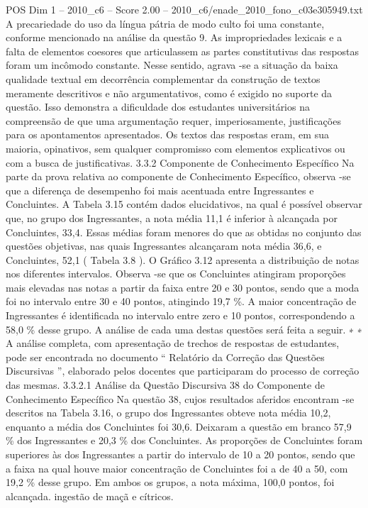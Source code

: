 \begin{textsample}{POS Dim 1 – 2010\_c6 – Score 2.00 – 2010\_c6/enade\_2010\_fono\_c03e305949.txt}
A precariedade do uso da língua pátria de modo culto foi uma constante, conforme mencionado na análise da questão 9.
As impropriedades lexicais e a falta de elementos coesores que articulassem as partes constitutivas das respostas foram um incômodo constante.
Nesse sentido, agrava -se a situação da baixa qualidade textual em decorrência complementar da construção de textos meramente descritivos e não argumentativos, como é exigido no suporte da questão.
Isso demonstra a dificuldade dos estudantes universitários na compreensão de que uma argumentação requer, imperiosamente, justificações para os apontamentos apresentados.
Os textos das respostas eram, em sua maioria, opinativos, sem qualquer compromisso com elementos explicativos ou com a busca de justificativas. 3.3.2 Componente de Conhecimento Específico Na parte da prova relativa ao componente de Conhecimento Específico, observa -se que a diferença de desempenho foi mais acentuada entre Ingressantes e Concluintes.
A Tabela 3.15 contém dados elucidativos, na qual é possível observar que, no grupo dos Ingressantes, a nota média 11,1 é inferior à alcançada por Concluintes, 33,4.
Essas médias foram menores do que as obtidas no conjunto das questões objetivas, nas quais Ingressantes alcançaram nota média 36,6, e Concluintes, 52,1 ( Tabela 3.8 ).
O Gráfico 3.12 apresenta a distribuição de notas nos diferentes intervalos.
Observa -se que os Concluintes atingiram proporções mais elevadas nas notas a partir da faixa entre 20 e 30 pontos, sendo que a moda foi no intervalo entre 30 e 40 pontos, atingindo 19,7 \%.
A maior concentração de Ingressantes é identificada no intervalo entre zero e 10 pontos, correspondendo a 58,0 \% desse grupo.
A análise de cada uma destas questões será feita a seguir. ∗ ∗ A análise completa, com apresentação de trechos de respostas de estudantes, pode ser encontrada no documento “ Relatório da Correção das Questões Discursivas ”, elaborado pelos docentes que participaram do processo de correção das mesmas. 3.3.2.1 Análise da Questão Discursiva 38 do Componente de Conhecimento Específico Na questão 38, cujos resultados aferidos encontram -se descritos na Tabela 3.16, o grupo dos Ingressantes obteve nota média 10,2, enquanto a média dos Concluintes foi 30,6.
Deixaram a questão em branco 57,9 \% dos Ingressantes e 20,3 \% dos Concluintes.
As proporções de Concluintes foram superiores às dos Ingressantes a partir do intervalo de 10 a 20 pontos, sendo que a faixa na qual houve maior concentração de Concluintes foi a de 40 a 50, com 19,2 \% desse grupo.
Em ambos os grupos, a nota máxima, 100,0 pontos, foi alcançada. ingestão de maçã e cítricos.

\end{textsample}
